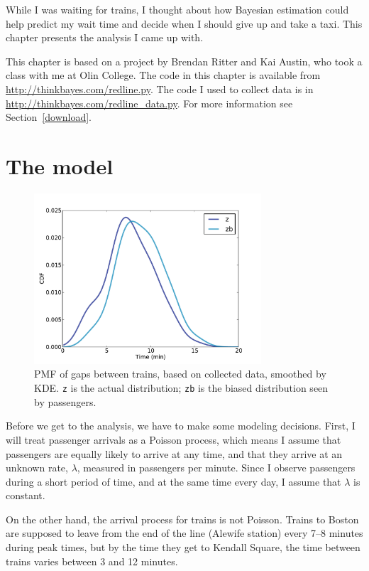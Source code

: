 \documentclass[12pt]{book}
\begin{document}
While I was waiting for trains, I thought about how Bayesian
estimation could help predict my wait time and decide when I
should give up and take a taxi.  This chapter presents the
analysis I came up with.

This chapter is based on a project by Brendan Ritter and
Kai Austin, who took a class with me at Olin College.
The code in this chapter is available from
\url{http://thinkbayes.com/redline.py}.  The code I used
to collect data is in \url{http://thinkbayes.com/redline_data.py}.
  For more information
see Section~\ref{download}.


\section{The model}

\begin{figure}
\centerline{\includegraphics[height=2.5in]{figs/redline0.pdf}}
\caption{PMF of gaps between trains, based on collected data,
smoothed by KDE.  {\tt z} is the actual distribution; {\tt zb}
is the biased distribution seen by passengers. }
\label{fig.redline0}
\end{figure}

Before we get to the analysis, we have to make some
modeling decisions.  First, I will treat passenger arrivals as
a Poisson process, which means I assume that passengers are equally
likely to arrive at any time, and that they arrive at an unknown
rate, $\lambda$, measured in passengers per minute.  Since I
observe passengers during a short period of time, and at the same
time every day, I assume that $\lambda$ is constant.

On the other hand, the arrival process for trains is not Poisson.
Trains to Boston are supposed to leave from the end of the line
(Alewife station) every 7--8 minutes during peak times, but by the time
they get to Kendall Square, the time between trains varies between 3
and 12 minutes.
\end{document}
